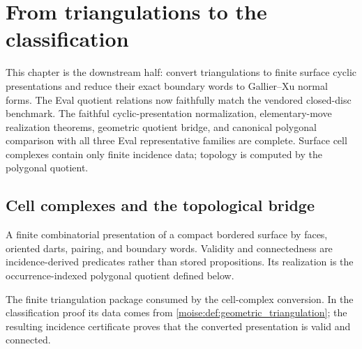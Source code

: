 \chapter{From triangulations to the classification}

This chapter is the downstream half: convert triangulations to finite surface
cyclic presentations and reduce their exact boundary words to Gallier--Xu
normal forms. The Eval quotient relations now faithfully match the vendored
closed-disc benchmark. The faithful cyclic-presentation normalization,
elementary-move realization theorems, geometric quotient bridge, and canonical
polygonal comparison with all three Eval representative families are complete.
Surface cell complexes contain only finite incidence data; topology is computed
by the polygonal quotient.

\section{Cell complexes and the topological bridge}

\begin{definition}
\label{moise:def:surface_cell_complex}
\leanok
A finite combinatorial presentation of a compact bordered surface by faces,
oriented darts, pairing, and boundary words.
Validity and connectedness are incidence-derived predicates rather than stored
propositions. Its realization is the occurrence-indexed polygonal quotient
defined below.
\end{definition}

\begin{definition}
\label{moise:def:finite_surface_triangulation}
\leanok
{}
The finite triangulation package consumed by the cell-complex conversion. In
the classification proof its data comes from
\ref{moise:def:geometric_triangulation}; the resulting incidence certificate
proves that the converted presentation is valid and connected.
\end{definition}

